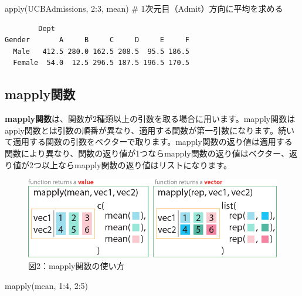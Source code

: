\documentclass[
  letterpaper,
  DIV=11,
  numbers=noendperiod]{scrreprt}
\newenvironment{Shaded}{\begin{snugshade}}{\end{snugshade}}
\newcommand{\CommentTok}[1]{\textcolor[rgb]{0.37,0.37,0.37}{#1}}
\newcommand{\DecValTok}[1]{\textcolor[rgb]{0.68,0.00,0.00}{#1}}
\newcommand{\FunctionTok}[1]{\textcolor[rgb]{0.28,0.35,0.67}{#1}}
\newcommand{\NormalTok}[1]{\textcolor[rgb]{0.00,0.23,0.31}{#1}}
\newcommand{\SpecialCharTok}[1]{\textcolor[rgb]{0.37,0.37,0.37}{#1}}
\begin{document}
\begin{Shaded}
\begin{Highlighting}[]
\FunctionTok{apply}\NormalTok{(UCBAdmissions, }\DecValTok{2}\SpecialCharTok{:}\DecValTok{3}\NormalTok{, mean) }\CommentTok{\# 1次元目（Admit）方向に平均を求める}
\end{Highlighting}
\end{Shaded}

\begin{verbatim}
        Dept
Gender       A     B     C     D     E     F
  Male   412.5 280.0 162.5 208.5  95.5 186.5
  Female  54.0  12.5 296.5 187.5 196.5 170.5
\end{verbatim}

\hypertarget{mapplyux95a2ux6570}{%
\subsection{mapply関数}\label{mapplyux95a2ux6570}}

\textbf{mapply関数}は、関数が2種類以上の引数を取る場合に用います。mapply関数はapply関数とは引数の順番が異なり、適用する関数が第一引数になります。続いて適用する関数の引数をベクターで取ります。mapply関数の返り値は適用する関数により異なり、関数の返り値が1つならmapply関数の返り値はベクター、返り値が2つ以上ならmapply関数の返り値はリストになります。

\begin{figure}

{\centering \includegraphics{././image/chapter15_mapply.png}

}

\caption{図2：mapply関数の使い方}

\end{figure}

\begin{Shaded}
\begin{Highlighting}[]
\FunctionTok{mapply}\NormalTok{(mean, }\DecValTok{1}\SpecialCharTok{:}\DecValTok{4}\NormalTok{, }\DecValTok{2}\SpecialCharTok{:}\DecValTok{5}\NormalTok{)}
\end{Highlighting}
\end{Shaded}
\end{document}
